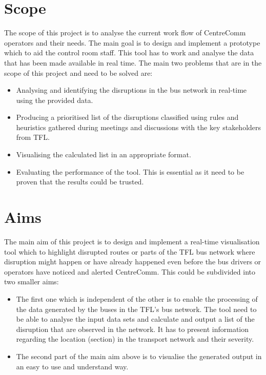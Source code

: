 \section{Scope}
The scope of this project is to analyse the current work flow of CentreComm operators and their needs. The main goal is to design and implement a prototype which to aid the control room staff. This tool has to work and analyse the data that has been made available in real time. The main two problems that are in the scope of this project and need to be solved are:
\begin{itemize}
	\item Analysing and identifying the disruptions in the bus network in real-time using the provided data.
	\item Producing a prioritised list of the disruptions classified using rules and heuristics gathered during meetings and discussions with the key stakeholders from TFL.
	\item Visualising the calculated list in an appropriate format.
	\item Evaluating the performance of the tool. This is essential as it need to be proven that the results could be trusted.
\end{itemize} 

\section{Aims}
The main aim of this project is to design and implement a real-time visualisation tool which to highlight disrupted routes or parts of the TFL bus network where disruption might happen or have already happened even before the bus drivers or operators have noticed and alerted CentreComm. This could be subdivided into two smaller aims:
\begin{itemize}
	\item The first one which is independent of the other is to enable the processing of the data generated by the buses in the TFL's bus network. The tool need to be able to analyse the input data sets and calculate and output a list of the disruption that are observed in the network. It has to present information regarding the location (section) in the transport network and their severity.
	\item The second part of the main aim above is to visualise the generated output in an easy to use and understand way.
\end{itemize}

